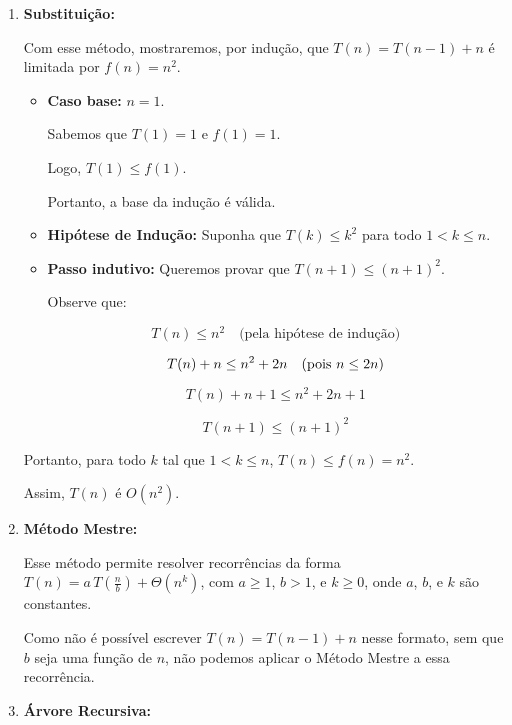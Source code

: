 \begin{enumerate}
    \item \textbf{Substituição:}
    
    Com esse método, mostraremos, por indução, que \( T(n) = T(n-1) + n \) é limitada por \( f(n) = n^2 \).
    
    \begin{itemize}
        \item \textbf{Caso base:} \( n = 1 \).
        
        Sabemos que \( T(1) = 1 \) e \( f(1) = 1 \).
        
        Logo, \( T(1) \leq f(1) \).
        
        Portanto, a base da indução é válida.
        
        \item \textbf{Hipótese de Indução:} Suponha que \( T(k) \leq k^2 \) para todo \( 1 < k \leq n \).
        
        \item \textbf{Passo indutivo:} Queremos provar que \( T(n+1) \leq (n+1)^2 \).
        
        Observe que:
        
        \[
        T(n) \leq n^2 \quad \text{(pela hipótese de indução)}
        \]
        
        \[
        T(n) + n \leq n^2 + 2n \quad \text{(pois \( n \leq 2n \))}
        \]
        
        \[
        T(n) + n + 1 \leq n^2 + 2n + 1
        \]
        
        \[
        T(n+1) \leq (n+1)^2
        \]
    \end{itemize}
    
    Portanto, para todo \( k \) tal que \( 1 < k \leq n \), \( T(n) \leq f(n) = n^2 \).
    
    Assim, \( T(n) \) é \( O(n^2) \).

    \item \textbf{Método Mestre:}

Esse método permite resolver recorrências da forma \( T(n) = a \, T\left(\frac{n}{b}\right) + \Theta(n^k) \), com \( a \geq 1 \), \( b > 1 \), e \( k \geq 0 \), onde \( a \), \( b \), e \( k \) são constantes.

Como não é possível escrever \( T(n) = T(n-1) + n \) nesse formato, sem que \( b \) seja uma função de \( n \), não podemos aplicar o Método Mestre a essa recorrência.

    
    \item \textbf{Árvore Recursiva:} 
    

\end{enumerate}
